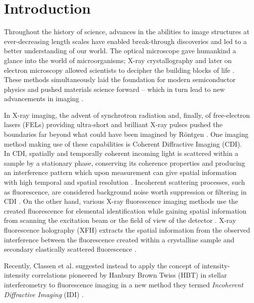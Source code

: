 \chapter{Introduction}
Throughout the history of science, advances in the abilities to image structures at ever-decreasing length scales have enabled break-through discoveries and led to a better understanding of our world.
The optical microscope gave humankind a glance into the world of microorganisms; X-ray crystallography and later on electron microscopy allowed scientists to decipher the building blocks of life \cite{hooke1665,laue1915,ruska1939,watson1953}. These methods simultaneously laid the foundation for modern semiconductor physics and pushed materials science forward
-- which in turn lead to new advancements in imaging \cite{teal1951,hovmoeller1984,jiang2018}.  

In X-ray imaging, the advent of synchrotron radiation and, finally, of free-electron lasers (FELs) providing ultra-short and brilliant X-ray pulses pushed the boundaries far beyond what could have been imagined by Röntgen \cite{cloetens1996,emma2010}. One imaging method making use of these capabilities is Coherent Diffractive Imaging (CDI). In CDI, spatially and temporally coherent incoming light is scattered within a sample by a stationary phase, conserving its coherence properties and producing an interference pattern which upon measurement can give spatial information with high temporal and spatial resolution \cite{seibert2011,bostedt2010,barke2015}. Incoherent scattering processes, such as fluorescence, are considered background noise worth suppression or filtering in CDI \cite{schultz2013chapter7}.  On the other hand, various X-ray fluorescence imaging methods use  the created fluorescence for elemental identification while gaining spatial information from scanning the excitation beam or the field of view of the detector \cite{vincze2004,pushie2014}.  X-ray fluorescence holography (XFH) extracts the spatial information from the observed interference between the fluorescence created within a crystalline sample and secondary elastically scattered fluorescence \cite{tegze1996,gog1996}.

Recently, Classen et al. suggested instead to apply the concept of intensity-intensity correlations pioneered by Hanbury Brown Twiss (HBT) in stellar interferometry to fluorescence imaging in a new method they termed \textit{Incoherent Diffractive Imaging} (IDI) \cite{classen2017,hanbury1956}. 

